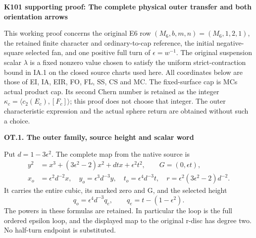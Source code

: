 \par\bigskip\noindent\textbf{K101 supporting proof: The complete physical outer transfer and both orientation arrows}\par\nobreak
This working proof concerns the original E6 row
\((M_6,b,m,n)=(M_6,1,2,1)\), the retained finite character and
ordinary-to-cap reference, the initial negative-square selected fan,
and one positive full turn of \(\epsilon=w^{-1}\). The original
suspension scalar \(\lambda\) is a fixed nonzero value chosen to
satisfy the uniform strict-contraction bound in IA.1 on the closed
source charts used here. All coordinates below are
those of EI, IA, EIR, FO, FL, SS, CS and MC. The fixed-surface cap is
MC\textquotesingle s actual product cap. Its second Chern number is retained as the
integer \(\kappa_c=\langle c_2(E_c),[F_c]\rangle\); this proof does
not choose that integer. The outer characteristic expression and
the actual sphere return are obtained without such a choice.

\par

\medskip\noindent\textbf{OT.1. The outer family, source height and scalar word}

\par\nobreak

Put \(d=1-3\epsilon^2\). The complete map from the native source is
\[
\begin{aligned}
y^2&=x^3+(3\epsilon^2-2)x^2+dt x+\epsilon^2t^2,
       \qquad G=(0,\epsilon t),\\
x_o&=\epsilon^2d^{-2}x,\quad
y_o=\epsilon^3d^{-3}y,\quad
t_o=\epsilon^4d^{-3}t,\quad
r=\epsilon^2(3\epsilon^2-2)d^{-2}.
\end{aligned}                                                   \tag{OT.1}
\]
It carries the entire cubic, its marked zero and G, and the selected
height
\[
q_o=\epsilon^4d^{-3}q_e,\qquad q_e=t-(1-\epsilon^2).       \tag{OT.2}
\]
The powers in these formulas are retained. In particular the loop
is the full ordered epsilon loop, and the displayed map to the
original r-disc has degree two. No half-turn endpoint is substituted.

